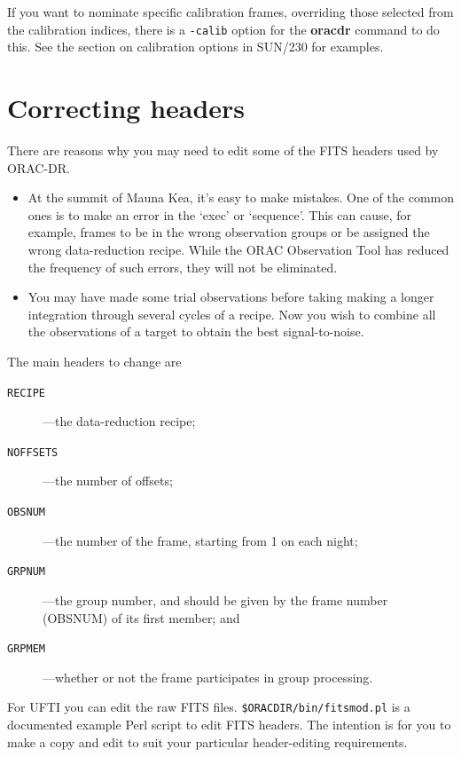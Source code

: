 \documentclass[twoside,11pt]{article}
\newenvironment{latexonly}{}{}
\newcommand{\xref}[3]{#1}
\newcommand{\xlabel}[1]{}
\renewcommand{\_}{\texttt{\symbol{95}}}
\newcommand{\ORACDR}{{\footnotesize ORAC-DR}}
\begin{document}
If you want to nominate specific calibration frames, overriding those
selected from the calibration indices, there is a {\tt -calib} option
for the {\bf oracdr} command to do this.  See
\begin{latexonly}
the section on
\end{latexonly}
\xref{calibration options}{sun230}{calibration_options}
\begin{latexonly}
in SUN/230
\end{latexonly}
for examples.

\section{\xlabel{correcting_headers}Correcting headers}

There are reasons why you may need to edit some of the FITS headers
used by \ORACDR.

\begin{itemize}
\item  At the summit of Mauna Kea, it's easy to make mistakes.  One of
the common ones is to make an error in the `exec' or `sequence'.  This
can cause, for example, frames to be in the wrong observation groups
or be assigned the wrong data-reduction recipe.  While the ORAC
Observation Tool has reduced the frequency of such errors, they will
not be eliminated.

\item You may have made some trial observations before taking making
a longer integration through several cycles of a recipe.  Now you wish
to combine all the observations of a target to obtain the best
signal-to-noise.  
\end{itemize}

The main headers to change are
\begin{description}
\item [{\tt RECIPE}]---the data-reduction recipe;
\item [{\tt NOFFSETS}]---the number of offsets;
\item [{\tt OBSNUM}]---the number of the frame, starting from 1 on
each night;
\item [{\tt GRPNUM}]---the group number, and should be
given by the frame number (OBSNUM) of its first member; and
\item [{\tt GRPMEM}]---whether or not the frame participates in group
processing.
\end{description}

For UFTI you can edit the raw FITS files.  {\tt \$ORAC\_DIR/bin/fitsmod.pl}
is a documented example Perl script to edit FITS headers.  The intention
is for you to make a copy and edit to suit your particular header-editing
requirements.
\end{document}
